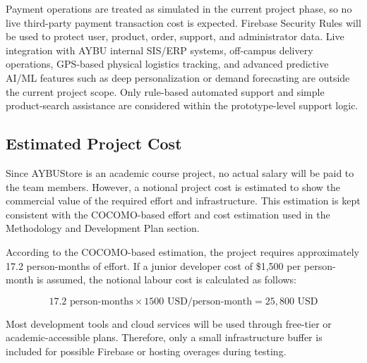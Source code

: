 \documentclass[11pt,a4paper]{article}
\begin{document}
Payment operations are treated as simulated in the current project phase, so
no live third-party payment transaction cost is expected. Firebase Security
Rules will be used to protect user, product, order, support, and administrator
data. Live integration with AYBU internal SIS/ERP systems, off-campus delivery
operations, GPS-based physical logistics tracking, and advanced predictive
AI/ML features such as deep personalization or demand forecasting are outside
the current project scope. Only rule-based automated support and simple
product-search assistance are considered within the prototype-level support
logic.

\subsection{Estimated Project Cost}

Since AYBUStore is an academic course project, no actual salary will be paid
to the team members. However, a notional project cost is estimated to show the
commercial value of the required effort and infrastructure. This estimation
is kept consistent with the COCOMO-based effort and cost estimation used in
the Methodology and Development Plan section.

According to the COCOMO-based estimation, the project requires approximately
17.2 person-months of effort. If a junior developer cost of \$1{,}500 per
person-month is assumed, the notional labour cost is calculated as follows:

\[
17.2 \text{ person-months} \times 1500 \text{ USD/person-month}
= 25{,}800 \text{ USD}
\]

Most development tools and cloud services will be used through free-tier or
academic-accessible plans. Therefore, only a small infrastructure buffer is
included for possible Firebase or hosting overages during testing.
\end{document}
